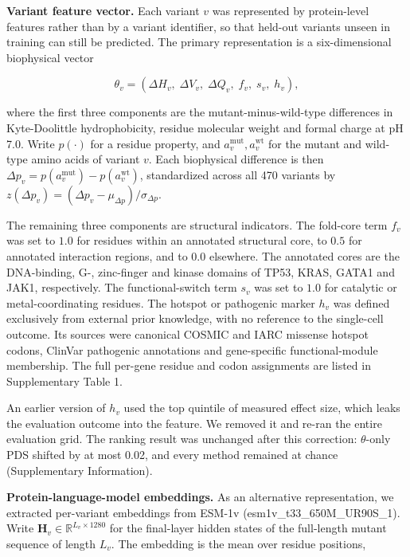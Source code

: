 \documentclass[11pt,letterpaper]{article}
\begin{document}
\textbf{Variant feature vector.} Each variant $v$ was represented by protein-level features rather than by a variant identifier, so that held-out variants unseen in training can still be predicted. The primary representation is a six-dimensional biophysical vector

\[
\theta_v = \left(\Delta H_v,\; \Delta V_v,\; \Delta Q_v,\; f_v,\; s_v,\; h_v\right),
\]

where the first three components are the mutant-minus-wild-type differences in Kyte-Doolittle hydrophobicity, residue molecular weight and formal charge at pH 7.0. Write $p(\cdot)$ for a residue property, and $a^{\mathrm{mut}}_v, a^{\mathrm{wt}}_v$ for the mutant and wild-type amino acids of variant $v$. Each biophysical difference is then $\Delta p_v = p(a^{\mathrm{mut}}_v) - p(a^{\mathrm{wt}}_v)$, standardized across all 470 variants by $z(\Delta p_v) = (\Delta p_v - \mu_{\Delta p})/\sigma_{\Delta p}$.

The remaining three components are structural indicators. The fold-core term $f_v$ was set to $1.0$ for residues within an annotated structural core, to $0.5$ for annotated interaction regions, and to $0.0$ elsewhere. The annotated cores are the DNA-binding, G-, zinc-finger and kinase domains of TP53, KRAS, GATA1 and JAK1, respectively. The functional-switch term $s_v$ was set to $1.0$ for catalytic or metal-coordinating residues. The hotspot or pathogenic marker $h_v$ was defined exclusively from external prior knowledge, with no reference to the single-cell outcome. Its sources were canonical COSMIC and IARC missense hotspot codons, ClinVar pathogenic annotations and gene-specific functional-module membership. The full per-gene residue and codon assignments are listed in Supplementary Table 1.

An earlier version of $h_v$ used the top quintile of measured effect size, which leaks the evaluation outcome into the feature. We removed it and re-ran the entire evaluation grid. The ranking result was unchanged after this correction: $\theta$-only PDS shifted by at most 0.02, and every method remained at chance (Supplementary Information).

\textbf{Protein-language-model embeddings.} As an alternative representation, we extracted per-variant embeddings from ESM-1v (esm1v\_t33\_650M\_UR90S\_1)\cite{ESM1v}. Write $\mathbf{H}_v \in \mathbb{R}^{L_v \times 1280}$ for the final-layer hidden states of the full-length mutant sequence of length $L_v$. The embedding is the mean over residue positions,
\end{document}
